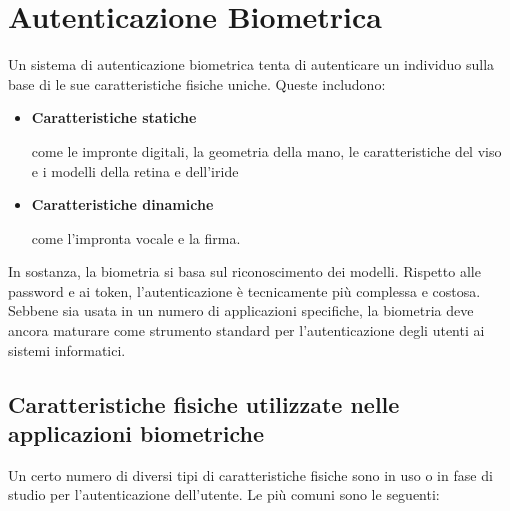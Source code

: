 \section{Autenticazione Biometrica}
Un sistema di autenticazione biometrica tenta di autenticare un individuo sulla base di le sue caratteristiche fisiche uniche. Queste includono:
\begin{itemize}
    \item \textbf{Caratteristiche statiche}
    
    come le impronte digitali, la geometria della mano, le caratteristiche del viso e i modelli della retina e dell'iride
    
    \item \textbf{Caratteristiche dinamiche}
    
    come l'impronta vocale e la firma.
\end{itemize}

In sostanza, la biometria si basa sul riconoscimento dei modelli. Rispetto alle password e ai token, l'autenticazione è tecnicamente più complessa e costosa. Sebbene sia usata in un numero di applicazioni specifiche, la biometria deve ancora maturare come strumento standard per l'autenticazione degli utenti ai sistemi informatici.

\subsection{Caratteristiche fisiche utilizzate nelle applicazioni biometriche}

Un certo numero di diversi tipi di caratteristiche fisiche sono in uso o in fase di studio per l'autenticazione dell'utente. Le più comuni sono le seguenti:

